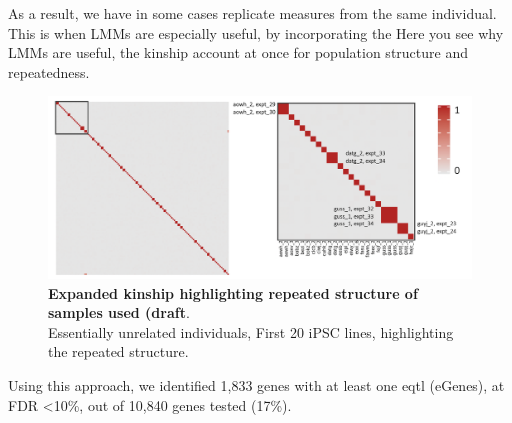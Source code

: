 
As a result, we have in some cases replicate measures from the same individual.
This is when LMMs are especially useful, by incorporating the
Here you see why LMMs are useful, the kinship account at once for population structure and repeatedness.

\begin{figure}[h]
\centering
\includegraphics[width=15cm]{Chapter3/Fig/kinship_repeatedness.png}
\caption[Kinship for repeats]{\textbf{Expanded kinship highlighting repeated structure of samples used (draft}.\\
Essentially unrelated individuals, 
First 20 iPSC lines, highlighting the repeated structure.}
\label{fig:kinship_repeats}
\end{figure}



Using this approach, we identified 1,833 genes with at least one \gls{eqtl} (eGenes), at FDR <10\%, out of 10,840 genes tested (17\%). 




